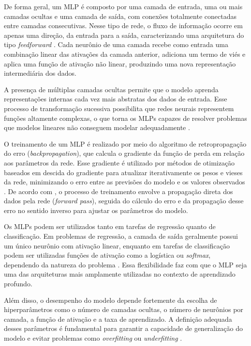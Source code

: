 De forma geral, um MLP é composto por uma camada de entrada, uma ou mais camadas ocultas e uma camada de saída, com conexões totalmente conectadas entre camadas consecutivas. 
Nesse tipo de rede, o fluxo de informação ocorre em apenas uma direção, da entrada para a saída, caracterizando uma arquitetura do tipo \textit{feedforward} \cite{Geron2019}. 
Cada neurônio de uma camada recebe como entrada uma combinação linear das ativações da camada anterior, adiciona um termo de viés e aplica uma função de ativação não linear, 
produzindo uma nova representação intermediária dos dados.

A presença de múltiplas camadas ocultas permite que o modelo aprenda representações internas cada vez mais abstratas dos dados de entrada. 
Esse processo de transformação sucessiva possibilita que redes neurais representem funções altamente complexas, o que torna os MLPs capazes de resolver 
problemas que modelos lineares não conseguem modelar adequadamente \cite{Goodfellow2016,Geron2019}.

O treinamento de um MLP é realizado por meio do algoritmo de retropropagação do erro (\textit{backpropagation}), que calcula o gradiente da função de perda 
em relação aos parâmetros da rede. Esse gradiente é utilizado por métodos de otimização baseados em descida do gradiente para atualizar iterativamente os pesos 
e vieses da rede, minimizando o erro entre as previsões do modelo e os valores observados \cite{Goodfellow2016}. 
De acordo com \cite{Geron2019}, o processo de treinamento envolve a propagação direta dos dados pela rede (\textit{forward pass}), seguida do cálculo do erro 
e da propagação desse erro no sentido inverso para ajustar os parâmetros do modelo.

Os MLPs podem ser utilizados tanto em tarefas de regressão quanto de classificação. Em problemas de regressão, a camada de saída geralmente possui um único neurônio 
com ativação linear, enquanto em tarefas de classificação podem ser utilizadas funções de ativação como a logística ou \textit{softmax}, dependendo da natureza do problema 
\cite{Geron2019}. Essa flexibilidade faz com que o MLP seja uma das arquiteturas mais amplamente utilizadas no contexto de aprendizado profundo.

Além disso, o desempenho do modelo depende fortemente da escolha de hiperparâmetros como o número de camadas ocultas, o número de neurônios por camada, a função de ativação 
e a taxa de aprendizado. A definição adequada desses parâmetros é fundamental para garantir a capacidade de generalização do modelo e evitar problemas como 
\textit{overfitting} ou \textit{underfitting} \cite{Geron2019}.

